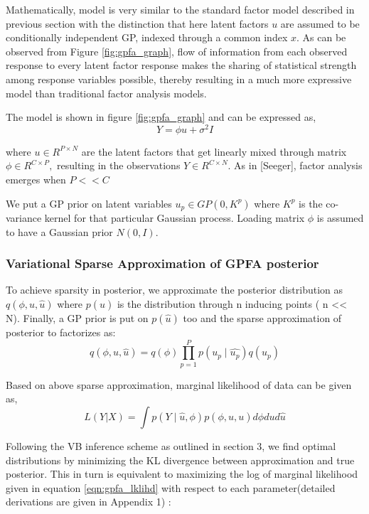 Mathematically, model is very similar to the standard factor model described in previous section with the distinction that here latent factors $u$ are assumed to be conditionally independent GP, indexed through a common index $x$. As can be observed from Figure \ref{fig:gpfa_graph}, flow of information from each observed response to every latent factor response makes the sharing of statistical strength among response variables possible, thereby resulting in a much more expressive model than traditional factor analysis models. 
\newpage

The model is shown in figure \ref{fig:gpfa_graph} and can be expressed as,
\begin{equation}
Y=\phi u + \sigma^2I
\end{equation}

where ${u \in R^{P \times N}}$ are the latent factors that get linearly mixed through matrix  ${\phi \in R^{C \times P},}$ resulting in the observations ${Y \in R^{C \times N}}$. As in [Seeger], factor analysis emerges when $P << C $ 

We put a GP prior on latent variables $ u_p \in GP(0,K^p)$ where $K^p$ is the co-variance kernel for that particular Gaussian process. Loading matrix $\phi$ is assumed to have a Gaussian prior $N(0,I)$. 

\subsubsection{Variational Sparse Approximation of GPFA posterior}

To achieve sparsity in posterior, we approximate the posterior distribution as $ q(\phi,u,\hat{u})$ where  $p(\hat{u})$ is the distribution through n inducing points ( n << N). Finally, a GP prior is put on $p(\hat{u})$ too and the sparse approximation of posterior to factorizes as: 
\begin{equation}
q(\phi,u,\hat{u}) = q(\phi)\prod_{p=1}^{P}p(u_p \mid \hat{u_p})q(u_p)
\end{equation}

Based on above sparse approximation, marginal likelihood of data can be given as,
\begin{equation}
L(Y|X) = \int p(Y \mid \hat{u},\phi) p(\phi,\hat{u},u) d\phi du d\hat{u}
\label{eqn:gpfa_lklihd}
\end{equation}

Following the VB inference scheme as outlined in section 3, we find optimal distributions by minimizing the KL divergence between approximation and true posterior. This in turn is equivalent to maximizing the log of marginal likelihood given in equation \ref{eqn:gpfa_lklihd} with respect to each parameter(detailed derivations are given in Appendix 1) :

